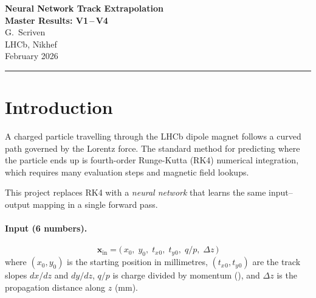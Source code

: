 \documentclass[11pt,a4paper]{article}
\newcommand{\si}[1]{\text{#1}}
\newcommand{\dz}{\Delta z}
\newcommand{\qop}{q/p}
\newcommand{\tx}{t_x}
\newcommand{\ty}{t_y}
\begin{document}
\begin{center}
  {\LARGE\bfseries Neural Network Track Extrapolation\\[4pt]
   Master Results: V1\,--\,V4}\\[12pt]
  {\large G.~Scriven}\\[4pt]
  {\normalsize LHCb, Nikhef}\\[4pt]
  {\normalsize February 2026}
\end{center}
\vspace{6pt}
\hrule
\vspace{12pt}

\begin{abstract}
This document aggregates all mathematics, architecture details, results and
figures from four iterative versions of neural-network-based track
extrapolators developed for the LHCb experiment.  Three model families are
studied---plain multi-layer perceptrons (MLPs), physics-informed neural
networks (PINNs) with a residual formulation, and Runge-Kutta-structured
PINNs (RK-PINNs) with collocation losses.  The document provides a
self-contained treatment of the underlying physics, the residual output
theory that guarantees initial conditions, and the collocation training
strategy for the RK-PINN, together with complete numerical results across
all versions.
\end{abstract}

\tableofcontents
\newpage

\section{Introduction}\label{sec:intro}

A charged particle travelling through the LHCb dipole magnet follows a
curved path governed by the Lorentz force.  The standard method for
predicting where the particle ends up is fourth-order Runge-Kutta (RK4)
numerical integration, which requires many evaluation steps and magnetic
field lookups.

This project replaces RK4 with a \emph{neural network} that learns the same
input--output mapping in a single forward pass.

\paragraph{Input (6 numbers).}
\begin{equation}\label{eq:input}
  \mathbf{x}_{\mathrm{in}} = \bigl(\, x_0,\; y_0,\; \tx{}_0,\; \ty{}_0,\;
  \qop,\; \dz \,\bigr)
\end{equation}
where $(x_0,y_0)$ is the starting position in millimetres, $(\tx{}_0,\ty{}_0)$
are the track slopes $dx/dz$ and $dy/dz$, $\qop$ is charge divided by
momentum (\si{\per\mega\electronvolt}), and $\dz$ is the propagation distance
along $z$ (mm).
\end{document}
